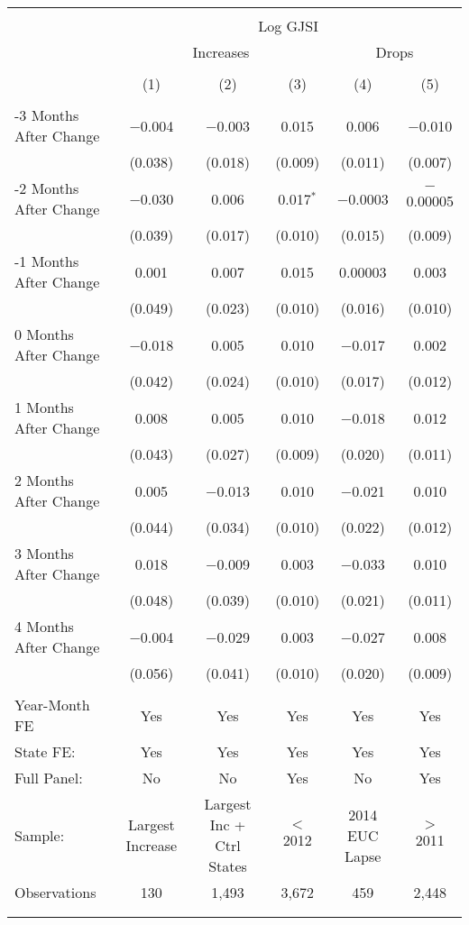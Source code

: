 
\begin{tabular}{@{\extracolsep{5pt}}lccccc} 
\\[-1.8ex]\hline 
\hline \\[-1.8ex] 
 & \multicolumn{5}{c}{Log GJSI} \\ 
\cline{2-6} 
 & \multicolumn{3}{c}{Increases} & \multicolumn{2}{c}{Drops} \\ 
\\[-2.5ex] & (1) & (2) & (3) & (4) & (5)\\ 
\hline \\[-1.8ex] 
 -3  Months After Change & $-$0.004 & $-$0.003 & 0.015 & 0.006 & $-$0.010 \\ 
  & (0.038) & (0.018) & (0.009) & (0.011) & (0.007) \\ 
 -2  Months After Change & $-$0.030 & 0.006 & 0.017$^{*}$ & $-$0.0003 & $-$0.00005 \\ 
  & (0.039) & (0.017) & (0.010) & (0.015) & (0.009) \\ 
 -1  Months After Change & 0.001 & 0.007 & 0.015 & 0.00003 & 0.003 \\ 
  & (0.049) & (0.023) & (0.010) & (0.016) & (0.010) \\ 
 0  Months After Change & $-$0.018 & 0.005 & 0.010 & $-$0.017 & 0.002 \\ 
  & (0.042) & (0.024) & (0.010) & (0.017) & (0.012) \\ 
 1  Months After Change & 0.008 & 0.005 & 0.010 & $-$0.018 & 0.012 \\ 
  & (0.043) & (0.027) & (0.009) & (0.020) & (0.011) \\ 
 2  Months After Change & 0.005 & $-$0.013 & 0.010 & $-$0.021 & 0.010 \\ 
  & (0.044) & (0.034) & (0.010) & (0.022) & (0.012) \\ 
 3  Months After Change & 0.018 & $-$0.009 & 0.003 & $-$0.033 & 0.010 \\ 
  & (0.048) & (0.039) & (0.010) & (0.021) & (0.011) \\ 
 4  Months After Change & $-$0.004 & $-$0.029 & 0.003 & $-$0.027 & 0.008 \\ 
  & (0.056) & (0.041) & (0.010) & (0.020) & (0.009) \\ 
\hline \\[-1.8ex] 
Year-Month FE & Yes & Yes & Yes & Yes & Yes \\ 
State FE: & Yes & Yes & Yes & Yes & Yes \\ 
Full Panel: & No & No & Yes & No & Yes \\ 
Sample: & Largest Increase  & Largest Inc + Ctrl States & $<$ 2012 & 2014 EUC Lapse & $>$ 2011 \\ 
Observations & 130 & 1,493 & 3,672 & 459 & 2,448 \\ 
\hline 
\hline \\
\vspace{-8mm}
\end{tabular} 
